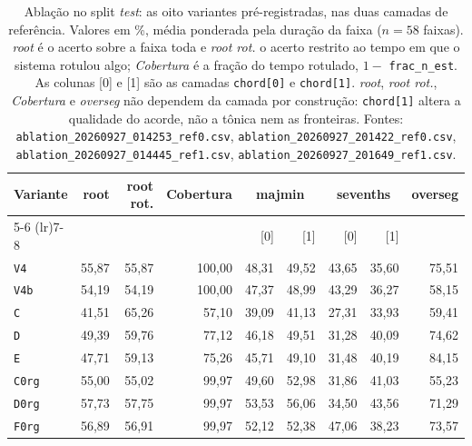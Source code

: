 \begin{table}[t]
  \centering
  \caption{Ablação no split \emph{test}: as oito variantes pré-registradas, nas duas camadas de referência. Valores em \%, média ponderada pela duração da faixa ($n = 58$ faixas). \emph{root} é o acerto sobre a faixa toda e \emph{root rot.} o acerto restrito ao tempo em que o sistema rotulou algo; \emph{Cobertura} é a fração do tempo rotulado, $1 -$ \texttt{frac\_n\_est}. As colunas [0] e [1] são as camadas \texttt{chord[0]} e \texttt{chord[1]}. \emph{root}, \emph{root rot.}, \emph{Cobertura} e \emph{overseg} não dependem da camada por construção: \texttt{chord[1]} altera a qualidade do acorde, não a tônica nem as fronteiras. Fontes: \texttt{ablation\_20260927\_014253\_ref0.csv}, \texttt{ablation\_20260927\_201422\_ref0.csv}, \texttt{ablation\_20260927\_014445\_ref1.csv}, \texttt{ablation\_20260927\_201649\_ref1.csv}.}
  \label{tab:ablacao}
  \footnotesize
  \begin{tabular}{lrrrrrrrr}
    \toprule
    Variante & root & root rot. & Cobertura & \multicolumn{2}{c}{majmin} & \multicolumn{2}{c}{sevenths} & overseg \\
    \cmidrule(lr){5-6} \cmidrule(lr){7-8}
     & & & & [0] & [1] & [0] & [1] & \\
    \midrule
    \texttt{V4} & 55,87 & 55,87 & 100,00 & 48,31 & 49,52 & 43,65 & 35,60 & 75,51 \\
    \texttt{V4b} & 54,19 & 54,19 & 100,00 & 47,37 & 48,99 & 43,29 & 36,27 & 58,15 \\
    \texttt{C} & 41,51 & 65,26 & 57,10 & 39,09 & 41,13 & 27,31 & 33,93 & 59,41 \\
    \texttt{D} & 49,39 & 59,76 & 77,12 & 46,18 & 49,51 & 31,28 & 40,09 & 74,62 \\
    \texttt{E} & 47,71 & 59,13 & 75,26 & 45,71 & 49,10 & 31,48 & 40,19 & 84,15 \\
    \texttt{C0rg} & 55,00 & 55,02 & 99,97 & 49,60 & 52,98 & 31,86 & 41,03 & 55,23 \\
    \texttt{D0rg} & 57,73 & 57,75 & 99,97 & 53,53 & 56,06 & 34,50 & 43,56 & 71,29 \\
    \texttt{F0rg} & 56,89 & 56,91 & 99,97 & 52,12 & 52,38 & 47,06 & 38,23 & 73,57 \\
    \bottomrule
  \end{tabular}
\end{table}
